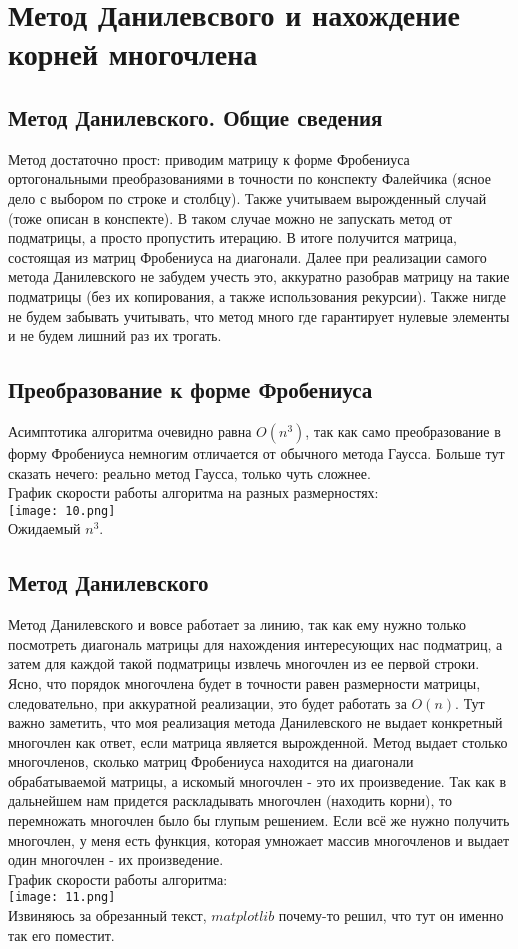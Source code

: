 \documentclass[a4paper,12pt,fleqn]{article}
\begin{document}
\section{Метод Данилевсвого и нахождение корней многочлена}
\subsection{Метод Данилевского. Общие сведения}
Метод достаточно прост: приводим матрицу к форме Фробениуса ортогональными преобразованиями в точности по конспекту Фалейчика (ясное дело с выбором по строке и столбцу). Также учитываем вырожденный случай (тоже описан в конспекте). В таком случае можно не запускать метод от подматрицы, а просто пропустить итерацию. В итоге получится матрица, состоящая из матриц Фробениуса на диагонали. Далее при реализации самого метода Данилевского не забудем учесть это, аккуратно разобрав матрицу на такие подматрицы (без их копирования, а также использования рекурсии). Также нигде не будем забывать учитывать, что метод много где гарантирует нулевые элементы и не будем лишний раз их трогать.

\subsection{Преобразование к форме Фробениуса}
Асимптотика алгоритма очевидно равна $O(n^3)$, так как само преобразование в форму Фробениуса немногим отличается от обычного метода Гаусса. Больше тут сказать нечего: реально метод Гаусса, только чуть сложнее.\\
График скорости работы алгоритма на разных размерностях:\\
\texttt{[image: 10.png]}\\
Ожидаемый $n^3$.

\subsection{Метод Данилевского}
Метод Данилевского и вовсе работает за линию, так как ему нужно только посмотреть диагональ матрицы для нахождения интересующих нас подматриц, а затем для каждой такой подматрицы извлечь многочлен из ее первой строки. Ясно, что порядок многочлена будет в точности равен размерности матрицы, следовательно, при аккуратной реализации, это будет работать за $O(n)$. Тут важно заметить, что моя реализация метода Данилевского не выдает конкретный многочлен как ответ, если матрица является вырожденной. Метод выдает столько многочленов, сколько матриц Фробениуса находится на диагонали обрабатываемой матрицы, а искомый многочлен - это их произведение. Так как в дальнейшем нам придется раскладывать многочлен (находить корни), то перемножать многочлен было бы глупым решением. Если всё же нужно получить многочлен, у меня есть функция, которая умножает массив многочленов и выдает один многочлен - их произведение. \\
График скорости работы алгоритма:\\
\texttt{[image: 11.png]}\\
Извиняюсь за обрезанный текст, $matplotlib$ почему-то решил, что тут он именно так его поместит.
\end{document}
